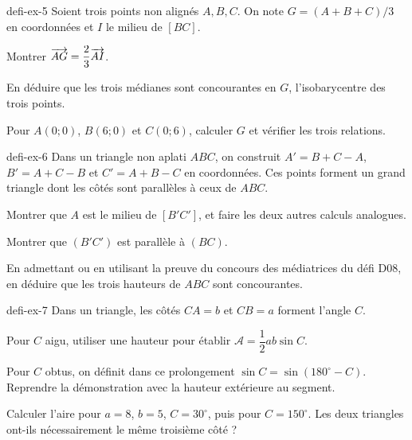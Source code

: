 \begin{blocEdition}{defi-ex-5}
Soient trois points non alignés $A,B,C$. On note $G=(A+B+C)/3$ en coordonnées et $I$ le milieu de $[BC]$.\begin{questions}
\item Montrer $\overrightarrow{AG}=\dfrac23\overrightarrow{AI}$.
\item En déduire que les trois médianes sont concourantes en $G$, l’isobarycentre des trois points.
\item Pour $A(0;0)$, $B(6;0)$ et $C(0;6)$, calculer $G$ et vérifier les trois relations.
\end{questions}\label{fig-defi-ex-5}

\end{blocEdition}
\begin{blocEdition}{defi-ex-6}
Dans un triangle non aplati $ABC$, on construit $A'=B+C-A$, $B'=A+C-B$ et $C'=A+B-C$ en coordonnées. Ces points forment un grand triangle dont les côtés sont parallèles à ceux de $ABC$.\begin{questions}
\item Montrer que $A$ est le milieu de $[B'C']$, et faire les deux autres calculs analogues.
\item Montrer que $(B'C')$ est parallèle à $(BC)$.
\item En admettant ou en utilisant la preuve du concours des médiatrices du défi D08, en déduire que les trois hauteurs de $ABC$ sont concourantes.
\end{questions}\label{fig-defi-ex-6}

\end{blocEdition}
\begin{blocEdition}{defi-ex-7}
Dans un triangle, les côtés $CA=b$ et $CB=a$ forment l’angle $C$.\begin{questions}
\item Pour $C$ aigu, utiliser une hauteur pour établir $\mathcal A=\dfrac12ab\sin C$.
\item Pour $C$ obtus, on définit dans ce prolongement $\sin C=\sin(180^\circ-C)$. Reprendre la démonstration avec la hauteur extérieure au segment.
\item Calculer l’aire pour $a=8$, $b=5$, $C=30^\circ$, puis pour $C=150^\circ$. Les deux triangles ont-ils nécessairement le même troisième côté ?
\end{questions}\label{fig-defi-ex-7}

\end{blocEdition}
